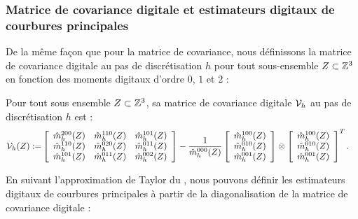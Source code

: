 \subsubsection{Matrice de covariance digitale et estimateurs digitaux de courbures principales}
%
De la même façon que pour la matrice de covariance, nous définissons la matrice
de covariance digitale au pas de discrétisation $h$ pour tout sous-ensemble
$Z \subset \mathbb{Z}^3$ en fonction des moments digitaux d'ordre $0$, $1$ et $2$ :
%
\begin{definition}{} \label{def:DigCovMatrix-def}
%
  Pour tout sous ensemble $Z \subset \mathbb{Z}^3$, sa matrice de covariance
  digitale $\mathcal{V}_{h}$ au pas de discrétisation $h$ est :
%
  \begin{align}
%
    \DCov{h}(Z) \EqDef &\left\lbrack
        \begin{array}{ccc}
          \DMom{200}{h}(\DigShape) & \DMom{110}{h}(\DigShape) & \DMom{101}{h}(\DigShape)\\
          \DMom{110}{h}(\DigShape) & \DMom{020}{h}(\DigShape) & \DMom{011}{h}(\DigShape)\\
          \DMom{101}{h}(\DigShape) & \DMom{011}{h}(\DigShape) & \DMom{002}{h}(\DigShape)
        \end{array}
        \right\rbrack
        - \frac{1}{\DMom{000}{h}(\DigShape)}
        \left\lbrack
        \begin{array}{c}
          \DMom{100}{h}(\DigShape) \\
          \DMom{010}{h}(\DigShape) \\
          \DMom{001}{h}(\DigShape) \\
        \end{array}
        \right\rbrack
        \otimes
        \left\lbrack
        \begin{array}{c}
          \DMom{100}{h}(\DigShape) \\
          \DMom{010}{h}(\DigShape) \\
          \DMom{001}{h}(\DigShape) \\
        \end{array}
        \right\rbrack^T.
%
  \end{align}
%
\end{definition}
%
En suivant l'approximation de Taylor du , nous pouvons
définir les estimateurs digitaux de courbures principales à partir de la
diagonalisation de la matrice de covariance digitale :
%
